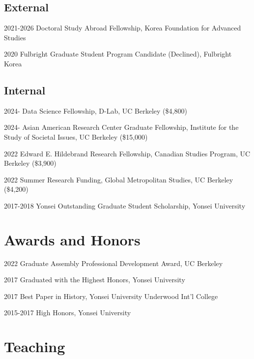 \documentclass[12pt,letterpaper]{report}
\begin{document}
    \subsection*{External}
    \begin{tablist}
        \item[2021-2026] \tab{}Doctoral Study Abroad Fellowship, Korea Foundation for Advanced Studies
        \item[2020] \tab{}Fulbright Graduate Student Program Candidate (Declined), Fulbright Korea
    \end{tablist}
    \subsection*{Internal}
    \begin{tablist}
        \item[2024-] \tab{}Data Science Fellowship, D-Lab, UC Berkeley (\$4,800)
        \item[2024-] \tab{}Asian American Research Center Graduate Fellowship, Institute for the Study of Societal Issues, UC Berkeley (\$15,000)
        \item[2022] \tab{}Edward E. Hildebrand Research Fellowship, Canadian Studies Program, UC Berkeley (\$3,900)
        \item[2022] \tab{}Summer Research Funding, Global Metropolitan Studies, UC Berkeley (\$4,200)
        \item[2017-2018] \tab{}Yonsei Outstanding Graduate Student Scholarship, Yonsei University
    \end{tablist}
    
\section*{Awards and Honors}
    \begin{tablist}
        \item[2022] \tab{}Graduate Assembly Professional Development Award, UC Berkeley
        \item[2017] \tab{}Graduated with the Highest Honors, Yonsei University
        \item[2017] \tab{}Best Paper in History, Yonsei University Underwood Int'l College
        \item[2015-2017] \tab{}High Honors, Yonsei University
    \end{tablist}

 \section*{Teaching}
\end{document}

